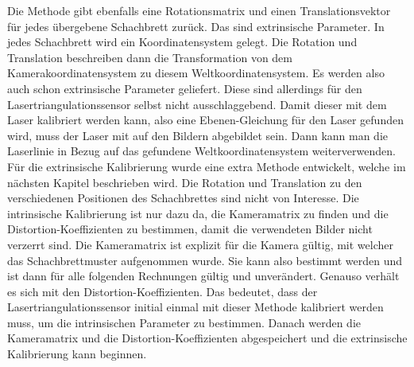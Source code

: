		Die Methode gibt ebenfalls eine Rotationsmatrix und einen Translationsvektor für jedes übergebene Schachbrett zurück. Das sind extrinsische Parameter. In jedes Schachbrett wird ein Koordinatensystem gelegt. Die Rotation und Translation beschreiben dann die Transformation von dem Kamerakoordinatensystem zu diesem Weltkoordinatensystem. Es werden also auch schon extrinsische Parameter geliefert. Diese sind allerdings für den Lasertriangulationssensor selbst nicht ausschlaggebend. Damit dieser mit dem Laser kalibriert werden kann, also eine Ebenen-Gleichung für den Laser gefunden wird, muss der Laser mit auf den Bildern abgebildet sein. Dann kann man die Laserlinie in Bezug auf das gefundene Weltkoordinatensystem weiterverwenden. Für die extrinsische Kalibrierung wurde eine extra Methode entwickelt, welche im nächsten Kapitel beschrieben wird. Die Rotation und Translation zu den verschiedenen Positionen des Schachbrettes sind nicht von Interesse. \newline
		Die intrinsische Kalibrierung ist nur dazu da, die Kameramatrix zu finden und die Distortion-Koeffizienten zu bestimmen, damit die verwendeten Bilder nicht verzerrt sind. Die Kameramatrix ist explizit für die Kamera gültig, mit welcher das Schachbrettmuster aufgenommen wurde. Sie kann also bestimmt werden und ist dann für alle folgenden Rechnungen gültig und unverändert. Genauso verhält es sich mit den Distortion-Koeffizienten. Das bedeutet, dass der Lasertriangulationssensor initial einmal mit dieser Methode kalibriert werden muss, um die intrinsischen Parameter zu bestimmen. Danach werden die Kameramatrix und die Distortion-Koeffizienten abgespeichert und die extrinsische Kalibrierung kann beginnen. 
			\label{chap:kalibrierung_intrinsisch}
			

